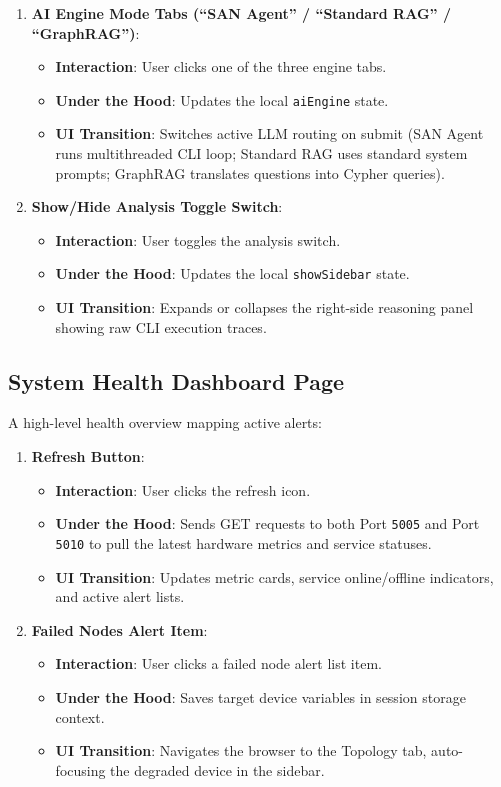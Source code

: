 \documentclass[11pt,a4paper]{article}
\begin{document}
\begin{enumerate}
    \item \textbf{AI Engine Mode Tabs (``SAN Agent'' / ``Standard RAG'' / ``GraphRAG'')}:
    \begin{itemize}
        \item \textbf{Interaction}: User clicks one of the three engine tabs.
        \item \textbf{Under the Hood}: Updates the local \texttt{aiEngine} state.
        \item \textbf{UI Transition}: Switches active LLM routing on submit (SAN Agent runs multithreaded CLI loop; Standard RAG uses standard system prompts; GraphRAG translates questions into Cypher queries).
    \end{itemize}
    
    \item \textbf{Show/Hide Analysis Toggle Switch}:
    \begin{itemize}
        \item \textbf{Interaction}: User toggles the analysis switch.
        \item \textbf{Under the Hood}: Updates the local \texttt{showSidebar} state.
        \item \textbf{UI Transition}: Expands or collapses the right-side reasoning panel showing raw CLI execution traces.
    \end{itemize}
\end{enumerate}

\subsection{System Health Dashboard Page}
A high-level health overview mapping active alerts:
\begin{enumerate}
    \item \textbf{Refresh Button}:
    \begin{itemize}
        \item \textbf{Interaction}: User clicks the refresh icon.
        \item \textbf{Under the Hood}: Sends GET requests to both Port \texttt{5005} and Port \texttt{5010} to pull the latest hardware metrics and service statuses.
        \item \textbf{UI Transition}: Updates metric cards, service online/offline indicators, and active alert lists.
    \end{itemize}
    
    \item \textbf{Failed Nodes Alert Item}:
    \begin{itemize}
        \item \textbf{Interaction}: User clicks a failed node alert list item.
        \item \textbf{Under the Hood}: Saves target device variables in session storage context.
        \item \textbf{UI Transition}: Navigates the browser to the Topology tab, auto-focusing the degraded device in the sidebar.
    \end{itemize}
\end{enumerate}
\end{document}
